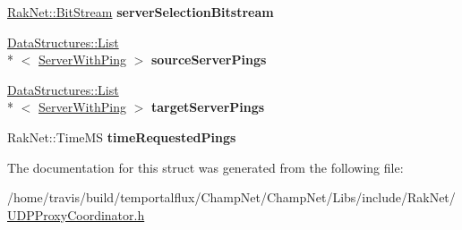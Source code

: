 \begin{DoxyCompactItemize}
\item 
\hypertarget{struct_rak_net_1_1_u_d_p_proxy_coordinator_1_1_forwarding_request_abea610c58ced2c2e7744103eee67391e}{\hyperlink{class_rak_net_1_1_bit_stream}{Rak\-Net\-::\-Bit\-Stream} {\bfseries server\-Selection\-Bitstream}}\label{struct_rak_net_1_1_u_d_p_proxy_coordinator_1_1_forwarding_request_abea610c58ced2c2e7744103eee67391e}

\item 
\hypertarget{struct_rak_net_1_1_u_d_p_proxy_coordinator_1_1_forwarding_request_aa88da41c639b9326a0ad0430c701866d}{\hyperlink{class_data_structures_1_1_list}{Data\-Structures\-::\-List}\\*
$<$ \hyperlink{struct_rak_net_1_1_u_d_p_proxy_coordinator_1_1_server_with_ping}{Server\-With\-Ping} $>$ {\bfseries source\-Server\-Pings}}\label{struct_rak_net_1_1_u_d_p_proxy_coordinator_1_1_forwarding_request_aa88da41c639b9326a0ad0430c701866d}

\item 
\hypertarget{struct_rak_net_1_1_u_d_p_proxy_coordinator_1_1_forwarding_request_ad5c93631bcc688dd8cec216f800ebe08}{\hyperlink{class_data_structures_1_1_list}{Data\-Structures\-::\-List}\\*
$<$ \hyperlink{struct_rak_net_1_1_u_d_p_proxy_coordinator_1_1_server_with_ping}{Server\-With\-Ping} $>$ {\bfseries target\-Server\-Pings}}\label{struct_rak_net_1_1_u_d_p_proxy_coordinator_1_1_forwarding_request_ad5c93631bcc688dd8cec216f800ebe08}

\item 
\hypertarget{struct_rak_net_1_1_u_d_p_proxy_coordinator_1_1_forwarding_request_ad526f348d6ddae0ff0df42930a5d4f6f}{Rak\-Net\-::\-Time\-M\-S {\bfseries time\-Requested\-Pings}}\label{struct_rak_net_1_1_u_d_p_proxy_coordinator_1_1_forwarding_request_ad526f348d6ddae0ff0df42930a5d4f6f}

\end{DoxyCompactItemize}


The documentation for this struct was generated from the following file\-:\begin{DoxyCompactItemize}
\item 
/home/travis/build/temportalflux/\-Champ\-Net/\-Champ\-Net/\-Libs/include/\-Rak\-Net/\hyperlink{_u_d_p_proxy_coordinator_8h}{U\-D\-P\-Proxy\-Coordinator.\-h}\end{DoxyCompactItemize}
